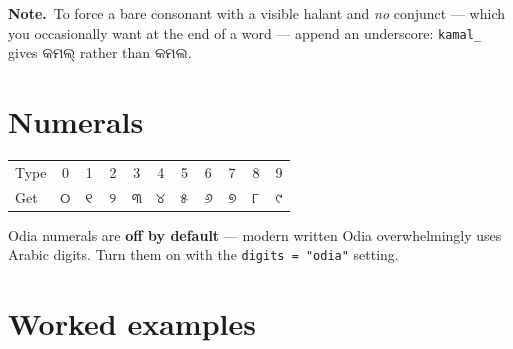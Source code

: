 \documentclass[11pt, a4paper]{article}
\newcommand{\od}[1]{{\odiafont #1}}          %
\newcommand{\odb}[1]{{\odiafont\large #1}}   %
\newcommand{\knote}{{\color{headerblue}\textbf{\textsf{Note.}}}\ }
\begin{document}
\begin{notebox}
\knote To force a bare consonant with a visible halant and \emph{no} conjunct --- which
you occasionally want at the end of a word --- append an underscore:
\texttt{kamal\_} gives \od{କମଲ୍} rather than \od{କମଲ}.
\end{notebox}

\section{Numerals}

\begin{center}
\begin{tabular}{l c c c c c c c c c c}
\toprule
Type   & 0 & 1 & 2 & 3 & 4 & 5 & 6 & 7 & 8 & 9 \\
Get    & \odb{୦} & \odb{୧} & \odb{୨} & \odb{୩} & \odb{୪} & \odb{୫} & \odb{୬} & \odb{୭} & \odb{୮} & \odb{୯} \\
\bottomrule
\end{tabular}
\end{center}

Odia numerals are \textbf{off by default} --- modern written Odia overwhelmingly uses
Arabic digits. Turn them on with the \texttt{digits = "odia"} setting.

\newpage
\section{Worked examples}
\end{document}
